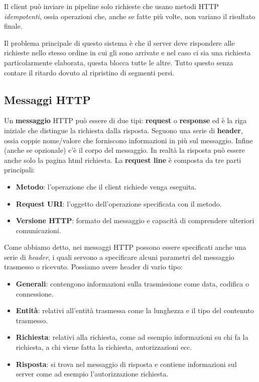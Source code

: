 Il client può inviare in pipeline solo richieste che usano metodi HTTP 
\emph{idempotenti}, ossia operazioni che, anche se fatte più volte,
non variano il risultato finale.

Il problema principale di questo sistema è che il server deve 
rispondere alle richieste nello stesso ordine in cui gli sono arrivate 
e nel caso ci sia una richiesta particolarmente elaborata, questa 
blocca tutte le altre. Tutto questo senza contare il ritardo dovuto
al ripristino di segmenti persi.

\subsection{Messaggi HTTP}
Un \textbf{messaggio} HTTP può essere di due tipi: \textbf{request} o 
\textbf{response} ed è la riga iniziale che distingue la richiesta 
dalla risposta. Seguono una serie di \textbf{header}, ossia coppie 
nome/valore che forniscono informazioni in più sul messaggio. Infine
(anche se opzionale) c'è il corpo del messaggio. In realtà la risposta 
può essere anche solo la pagina html richiesta. La \textbf{request 
line} è composta da tre parti principali:
\begin{itemize}
	\item \textbf{Metodo}: l'operazione che il client richiede venga 
		eseguita.
	\item \textbf{Request URI}: l'oggetto dell'operazione specificata 
		con il metodo.
	\item \textbf{Versione HTTP}: formato del messaggio e capacità di 
		comprendere ulteriori comunicazioni.
\end{itemize}
Come abbiamo detto, nei messaggi HTTP possono essere specificati anche 
una serie di \emph{header}, i quali servono a specificare alcuni 
parametri del messaggio trasmesso o ricevuto. Possiamo avere header di 
vario tipo:
\begin{itemize}
	\item \textbf{Generali}: contengono informazioni sulla trasmissione
		come data, codifica o connessione.
	\item \textbf{Entità}: relativi all'entità trasmessa come la 
		lunghezza e il tipo del contenuto trasmesso.
	\item \textbf{Richiesta}: relativi alla richiesta, come ad esempio
		informazioni su chi fa la richiesta, a chi viene fatta la 
		richiesta, autorizzazioni ecc.
	\item \textbf{Risposta}: si trova nel messaggio di risposta e 
		contiene informazioni sul server come ad esempio 
		l'autorizzazione richiesta.
\end{itemize}
